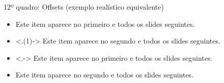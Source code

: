 \documentclass{beamer}
\begin{document}
\begin{frame}{12º quadro: Offsets (exemplo realístico equivalente)}

    \begin{itemize}
        \item<+-> Este item aparece no primeiro e todos os slides seguintes.
        \item<.(1)-> Este item aparece no segundo e todos os slides seguintes.
        \item<.-> Este item aparece no primeiro e todos os slides seguintes.
        \item<+-> Este item aparece no segundo e todos os slides seguintes.
    \end{itemize}
\end{frame}
\end{document}
